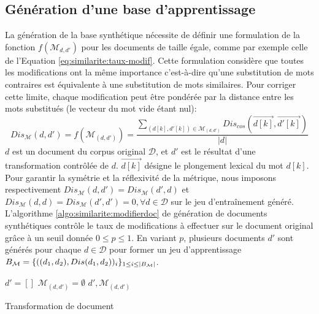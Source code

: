\subsection{Génération d'une base d'apprentissage}
La génération de la base synthétique nécessite de définir une formulation de la fonction $f(\mathcal{M}_{d, d'})$ pour les documents de taille égale, comme par exemple celle de l'Equation \ref{eq:similarite:taux-modif}. Cette formulation considère que toutes les modifications ont la même importance c'est-à-dire qu'une substitution de mots contraires est équivalente à une substitution de mots similaires. Pour corriger cette limite, chaque modification peut être pondérée par la distance entre les mots substitués (le vecteur du  \og mot vide \fg{} étant nul):
\begin{equation}
{Dis_\mathcal{M}}(d,d') = {f}(\mathcal{M}_{(d,d')}) = \frac{\sum\limits_{(d[k], d'[k]) \in \mathcal{M}_{(d,d')}} Dis_{cos}(\overrightarrow{d[k]}, \overrightarrow{d'[k]})}{\vert d \vert} \label{eq:similarite:somme-dist-mots}
\end{equation}
$d$ est un document du corpus original $\mathcal{D}$, et $d'$ est le résultat d'une transformation contrôlée de $d$. $\overrightarrow{d[k]}$ désigne le plongement lexical du mot $d[k]$. Pour garantir la symétrie et la réflexivité de la métrique, nous imposons respectivement ${Dis_\mathcal{M}}(d,d') = {Dis_\mathcal{M}}(d', d)$ et ${Dis_\mathcal{M}}(d, d) = {Dis_\mathcal{M}}(d', d') = 0, \forall d \in \mathcal{D}$ sur le jeu d'entraînement généré. L'algorithme \ref{algo:similarite:modifierdoc} de génération de documents synthétiques contrôle le taux de modifications à effectuer sur le document original grâce à un seuil donnée $0\leq p\leq1$. En variant $p$, plusieurs documents $d'$ sont générés pour chaque $d \in \mathcal{D}$ pour former un jeu d'apprentissage $B_\mathcal{M} = \lbrace ((d_1, d_2), {Dis}(d_1, d_2))_i\rbrace_{1 \leq i \leq {\vert B_\mathcal{M}\vert}}$.

\begin{algorithm}[!htb] %
	\small
 ${d'} = [] $\; 
 $\mathcal{M}_{(d,d')} = \emptyset$\;
 \Return $d', \mathcal{M}_{(d,d')}$\;
 \caption{Transformation de document} \label{algo:similarite:modifierdoc}
\end{algorithm}



